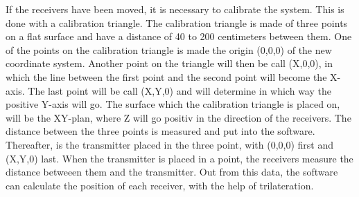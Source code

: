 If the receivers have been moved, it is necessary to calibrate the system. This is done with a calibration triangle. The calibration triangle is made of three points on a flat surface and have a distance of 40 to 200 centimeters between them. One of the points on the calibration triangle is made the origin (0,0,0) of the new coordinate system. Another point on the triangle will then be call (X,0,0), in which the line between the first point and the second point will become the X-axis. The last point will be call (X,Y,0) and will determine in which way the positive Y-axis will go. The surface which the calibration triangle is placed on, will be the XY-plan, where Z will go positiv in the direction of the receivers. The distance between the three points is measured and put into the software. Thereafter, is the transmitter placed in the three point, with (0,0,0) first and (X,Y,0) last. When the transmitter is placed in a point, the receivers measure the distance betweeen them and the transmitter. Out from this data, the software can calculate the position of each receiver, with the help of trilateration. \\\\

